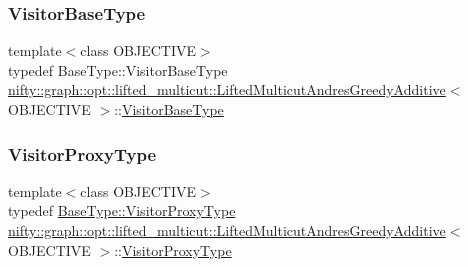\subsubsection{\texorpdfstring{Visitor\+Base\+Type}{VisitorBaseType}}
{\footnotesize\ttfamily template$<$class O\+B\+J\+E\+C\+T\+I\+VE$>$ \\
typedef Base\+Type\+::\+Visitor\+Base\+Type \hyperlink{classnifty_1_1graph_1_1opt_1_1lifted__multicut_1_1LiftedMulticutAndresGreedyAdditive}{nifty\+::graph\+::opt\+::lifted\+\_\+multicut\+::\+Lifted\+Multicut\+Andres\+Greedy\+Additive}$<$ O\+B\+J\+E\+C\+T\+I\+VE $>$\+::\hyperlink{classnifty_1_1graph_1_1opt_1_1lifted__multicut_1_1LiftedMulticutAndresGreedyAdditive_aaec5054a53fdbf048b7e2b63959db03e}{Visitor\+Base\+Type}}

\mbox{\label{classnifty_1_1graph_1_1opt_1_1lifted__multicut_1_1LiftedMulticutAndresGreedyAdditive_a6b35ea13bacfe0442cc6bcca83517c7c}} 
\subsubsection{\texorpdfstring{Visitor\+Proxy\+Type}{VisitorProxyType}}
{\footnotesize\ttfamily template$<$class O\+B\+J\+E\+C\+T\+I\+VE$>$ \\
typedef \hyperlink{classnifty_1_1graph_1_1opt_1_1common_1_1SolverBase_ad209b469b3bc9fc0fc14e9fed4d09075}{Base\+Type\+::\+Visitor\+Proxy\+Type} \hyperlink{classnifty_1_1graph_1_1opt_1_1lifted__multicut_1_1LiftedMulticutAndresGreedyAdditive}{nifty\+::graph\+::opt\+::lifted\+\_\+multicut\+::\+Lifted\+Multicut\+Andres\+Greedy\+Additive}$<$ O\+B\+J\+E\+C\+T\+I\+VE $>$\+::\hyperlink{classnifty_1_1graph_1_1opt_1_1lifted__multicut_1_1LiftedMulticutAndresGreedyAdditive_a6b35ea13bacfe0442cc6bcca83517c7c}{Visitor\+Proxy\+Type}}



